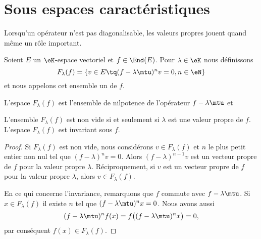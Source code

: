 \section{Sous espaces caractéristiques}


Lorsqu'un opérateur n'est pas diagonalisable, les valeurs propres jouent quand même un rôle important.

\begin{definition}  \label{DefFBNIooCGbIix}
	Soient \( E\) un \( \eK\)-espace vectoriel et \( f\in\End(E)\). Pour \( \lambda\in \eK\) nous définissons
	\begin{equation}
		F_{\lambda}(f)=\{ v\in E\tq (f-\lambda\mtu)^nv=0, n\in\eN \}
	\end{equation}
	et nous appelons cet ensemble un  de \( f\).
\end{definition}
L'espace \( F_{\lambda}(f)\) est l'ensemble de nilpotence de l'opérateur \( f-\lambda\mtu\) et

\begin{lemma}   \label{LemBLPooHMAoyJ}
	L'ensemble \( F_{\lambda}(f)\) est non vide si et seulement si \( \lambda\) est une valeur propre de \( f\). L'espace \( F_{\lambda}(f)\) est invariant sous \( f\).
\end{lemma}

\begin{proof}
	Si \( F_{\lambda}(f)\) est non vide, nous considérons \( v\in F_{\lambda}(f)\) et \( n\) le plus petit entier non nul tel que \( (f-\lambda)^nv=0\). Alors \( (f-\lambda)^{n-1}v\) est un vecteur propre de \( f\) pour la valeur propre \( \lambda\). Réciproquement, si \( v\) est un vecteur propre de \( f\) pour la valeur propre \( \lambda\), alors \( v\in F_{\lambda}(f)\).

	En ce qui concerne l'invariance, remarquons que \( f\) commute avec \( f-\lambda\mtu\). Si \( x\in F_{\lambda}(f)\) il existe \( n\) tel que \( (f-\lambda\mtu)^nx=0\). Nous avons aussi
	\begin{equation}
		(f-\lambda\mtu)^nf(x)=f\big( (f-\lambda\mtu)^nx \big)=0,
	\end{equation}
	par conséquent \( f(x)\in F_{\lambda}(f)\).
\end{proof}

